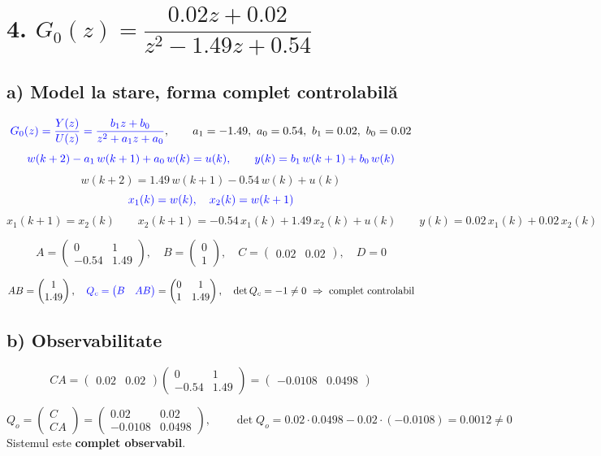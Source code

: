 \documentclass[10pt,a4paper]{article}
\begin{document}
\section*{4. $G_0(z)=\dfrac{0.02z+0.02}{z^2-1.49z+0.54}$}

\subsection*{a) Model la stare, forma complet controlabilă}
$$\textcolor{blue}{G_0(z)=\frac{Y(z)}{U(z)}=\frac{b_1z+b_0}{z^2+a_1z+a_0}},\qquad a_1=-1.49,\ a_0=0.54,\ b_1=0.02,\ b_0=0.02$$
$$\color{blue}w(k+2)-a_1\,w(k+1)+a_0\,w(k)=u(k),\qquad y(k)=b_1\,w(k+1)+b_0\,w(k)$$
$$w(k+2)=1.49\,w(k+1)-0.54\,w(k)+u(k)$$
$$\color{blue}x_1(k)=w(k),\quad x_2(k)=w(k+1)$$
$$x_1(k+1)=x_2(k)\qquad x_2(k+1)=-0.54\,x_1(k)+1.49\,x_2(k)+u(k)\qquad y(k)=0.02\,x_1(k)+0.02\,x_2(k)$$
\begin{res}
$$A=\begin{pmatrix}0&1\\-0.54&1.49\end{pmatrix},\quad B=\begin{pmatrix}0\\1\end{pmatrix},\quad C=\begin{pmatrix}0.02&0.02\end{pmatrix},\quad D=0$$
\end{res}
$$AB=\begin{pmatrix}1\\1.49\end{pmatrix},\quad \textcolor{blue}{Q_c=\begin{pmatrix}B & AB\end{pmatrix}}=\begin{pmatrix}0&1\\1&1.49\end{pmatrix},\quad \det Q_c=-1\ne0\ \Rightarrow\ \text{complet controlabil}$$

\subsection*{b) Observabilitate}
$$CA=\begin{pmatrix}0.02&0.02\end{pmatrix}\begin{pmatrix}0&1\\-0.54&1.49\end{pmatrix}=\begin{pmatrix}-0.0108&0.0498\end{pmatrix}$$
\begin{res}
$$Q_o=\begin{pmatrix}C\\CA\end{pmatrix}=\begin{pmatrix}0.02&0.02\\-0.0108&0.0498\end{pmatrix},\qquad \det Q_o=0.02\cdot0.0498-0.02\cdot(-0.0108)=0.0012\ne0$$
Sistemul este \textbf{complet observabil}.
\end{res}
\end{document}
